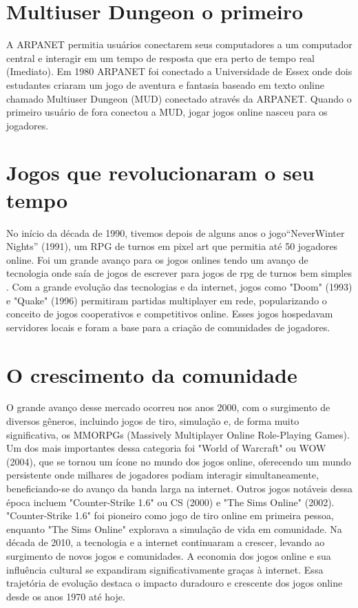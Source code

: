 \documentclass[conference]{ModeloA}
\begin{document}
\section{Multiuser Dungeon o primeiro}
A ARPANET permitia usuários conectarem seus computadores a um computador central e interagir em um tempo de resposta que era perto de tempo real (Imediato). Em 1980 ARPANET foi conectado a Universidade de Essex onde dois estudantes criaram um jogo de aventura e fantasia baseado em texto online chamado Multiuser Dungeon (MUD) conectado através da ARPANET. Quando o primeiro usuário de fora conectou a MUD, jogar jogos online nasceu para os jogadores\cite{Britannica}.
\section{Jogos que revolucionaram o seu tempo}
No início da década de 1990, tivemos depois de alguns anos o jogo“NeverWinter Nights” (1991), um RPG de turnos em pixel art que permitia até 50 jogadores online. Foi um grande avanço para os jogos onlines tendo um avanço de tecnologia onde saía de jogos de escrever para jogos de rpg de turnos bem simples  . Com a grande evolução das tecnologias e da internet, jogos como "Doom" (1993) e "Quake" (1996) permitiram partidas multiplayer em rede, popularizando o conceito de jogos cooperativos e competitivos online. Esses jogos hospedavam servidores locais e foram a base para a criação de comunidades de jogadores\cite{WikipediaNWN}.
\section{O crescimento da comunidade}
O grande avanço desse mercado ocorreu nos anos 2000, com o surgimento de diversos gêneros, incluindo jogos de tiro, simulação e, de forma muito significativa, os MMORPGs (Massively Multiplayer Online Role-Playing Games). Um dos mais importantes dessa categoria foi "World of Warcraft" ou WOW (2004), que se tornou um ícone no mundo dos jogos online, oferecendo um mundo persistente onde milhares de jogadores podiam interagir simultaneamente, beneficiando-se do avanço da banda larga na internet. Outros jogos notáveis dessa época incluem "Counter-Strike 1.6" ou CS (2000) e "The Sims Online" (2002). "Counter-Strike 1.6" foi pioneiro como jogo de tiro online em primeira pessoa, enquanto "The Sims Online" explorava a simulação de vida em comunidade. Na década de 2010, a tecnologia e a internet continuaram a crescer, levando ao surgimento de novos jogos e comunidades. A economia dos jogos online e sua influência cultural se expandiram significativamente graças à internet. Essa trajetória de evolução destaca o impacto duradouro e crescente dos jogos online desde os anos 1970 até hoje\cite{WikipediaNWN}.
\end{document}
